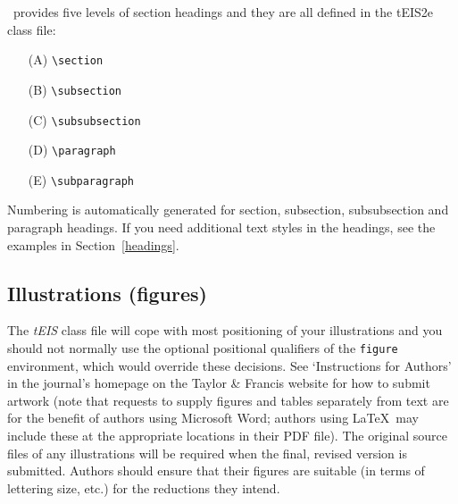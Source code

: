 \documentclass[]{tEIS2e}
\theoremstyle{plain}
\theoremstyle{remark}
\begin{document}
\LaTeXe\ provides five levels of section headings and they are all defined in the tEIS2e class file:
\begin{enumerate}
   \item[(A)] \verb"\section"
   \item[(B)] \verb"\subsection"
   \item[(C)] \verb"\subsubsection"
   \item[(D)] \verb"\paragraph"
   \item[(E)] \verb"\subparagraph"
\end{enumerate}
Numbering is automatically generated for section, subsection, subsubsection and paragraph headings. If you need
additional text styles in the headings, see the examples in Section~\ref{headings}.


\subsection{Illustrations (figures)}

The {\it tEIS} class file will cope with most positioning of your illustrations and you should not normally use the optional positional qualifiers of the {\tt figure} environment, which would override these decisions. See `Instructions for Authors' in the journal's homepage on the Taylor \& Francis website for how to submit artwork (note that requests to supply figures and tables separately from text are for the benefit of authors using Microsoft Word; authors using \LaTeX\ may include these at the appropriate locations in their PDF file). The original source files of any illustrations will be required when the final, revised version is submitted. Authors should ensure that their figures are suitable (in terms of lettering size, etc.) for the reductions they intend.
\end{document}
